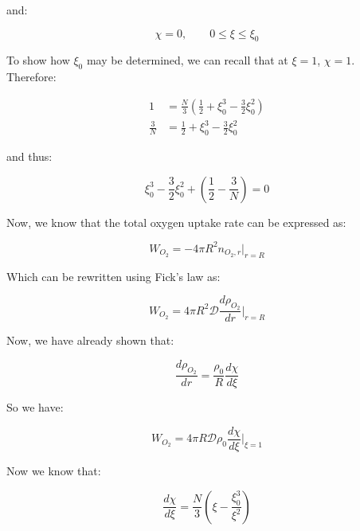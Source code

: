 \documentclass[letterpaper,12pt]{article}
\begin{document}
and:

\begin{equation}
\boxed{
    \chi = 0, \qquad 0 \leq \xi \leq \xi_0
}
\end{equation}

To show how $\xi_0$ may be determined, we can recall that at $\xi = 1$, $\chi = 1$. Therefore:

\begin{equation}
\begin{aligned}
    1           &= \frac{N}{3} \left( \frac{1}{2} + \xi_0^3 - \frac{3}{2} \xi^2_0 \right) \\
    \frac{3}{N} &= \frac{1}{2} + \xi_0^3 - \frac{3}{2} \xi^2_0
\end{aligned}
\end{equation}

and thus:

\begin{equation}
\boxed{
    \xi_0^3 -\frac{3}{2} \xi_0^2 + \left( \frac{1}{2} - \frac{3}{N} \right) = 0
}
\end{equation}

Now, we know that the total oxygen uptake rate can be expressed as:

\begin{equation}
    W_{O_2} = -4\pi R^2 n_{O_2,r}\big|_{r=R}
\end{equation}

Which can be rewritten using Fick's law as:

\begin{equation}
    W_{O_2} = 4\pi R^2 \mathcal{D} \frac{d\rho_{O_2}}{dr} \big|_{r=R}
\end{equation}

Now, we have already shown that:

\begin{equation}
    \frac{d \rho_{O_2}}{d r} = \frac{\rho_0}{R} \frac{d \chi}{d \xi}
\end{equation}

So we have:

\begin{equation}
    W_{O_2} = 4\pi R \mathcal{D} \rho_0 \frac{d \chi}{d \xi} \big|_{\xi=1}
\end{equation}

Now we know that:

\begin{equation}
    \frac{d \chi}{d \xi} = \frac{N}{3} \left( \xi - \frac{\xi_0^3}{\xi^2} \right)
\end{equation}
\end{document}
